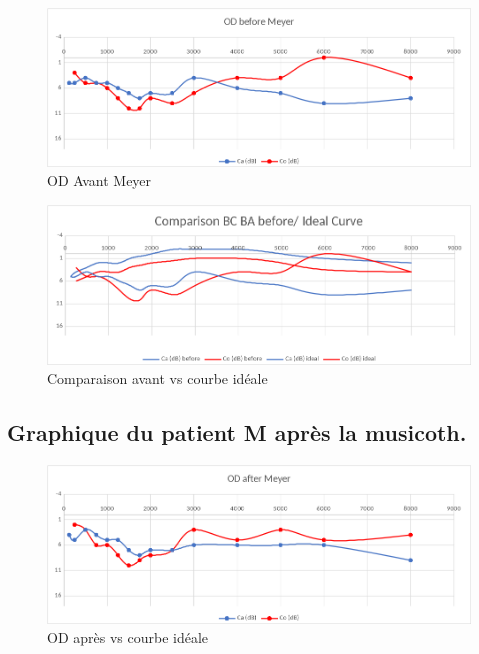  
 	
 	\begin{figure}[tbh]
 		\centering
 		\includegraphics[width=0.7\linewidth]{images/clinique/od_before_meyer.png}
 		\caption{OD Avant Meyer}
 		\label{fig:odbeforemeyer}
 	\end{figure}
 	
 	\lipsum[1]
 	
 	
 	
 	
 	\begin{figure}
 		\centering
 		\includegraphics[width=0.7\linewidth]{images/clinique/comparison_bc_ba_before_vs_ideal_curve_meyer.png}
 		\caption[Avant vs courbe idéale]{Comparaison avant vs courbe idéale}
 		\label{fig:comparisonbcbabeforevsidealcurvemeyer}
 	\end{figure}
 	
 	
 	\subsection{Graphique du patient M après la musicoth.}
 	\lipsum[1]
 	\begin{figure}[h]
 		\centering

 		\includegraphics[width=0.7\linewidth]{images/clinique/od_after_meyer.png}
 		\caption{OD après vs courbe idéale}
 		\label{fig:odaftermeyer}
 	\end{figure}
 
 \lipsum[1]
 

